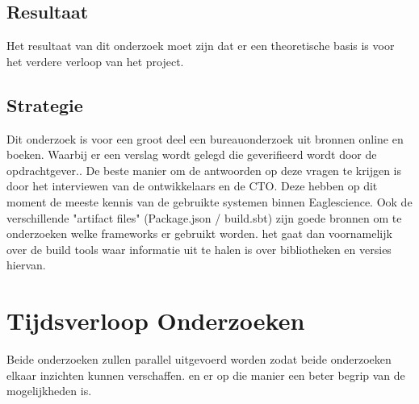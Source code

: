 \subsection{Resultaat}%
Het resultaat van dit onderzoek moet zijn dat er een theoretische basis is voor het verdere verloop van het project.
\subsection{Strategie}
Dit onderzoek is voor een groot deel een bureauonderzoek uit bronnen online en boeken. Waarbij er een verslag wordt gelegd die geverifieerd wordt door de opdrachtgever..
De beste manier om de antwoorden op deze vragen te krijgen is door het interviewen van de ontwikkelaars en de CTO. Deze hebben op dit moment de meeste kennis van de gebruikte systemen binnen Eaglescience. Ook de verschillende "artifact files" (Package.json / build.sbt) zijn goede bronnen om te onderzoeken welke frameworks er gebruikt worden. het gaat dan voornamelijk over de build tools waar informatie uit te halen is over bibliotheken en versies hiervan.

\section{Tijdsverloop Onderzoeken}
Beide onderzoeken zullen parallel uitgevoerd worden zodat beide onderzoeken elkaar inzichten kunnen verschaffen. en er op die manier een beter begrip van de mogelijkheden is.
